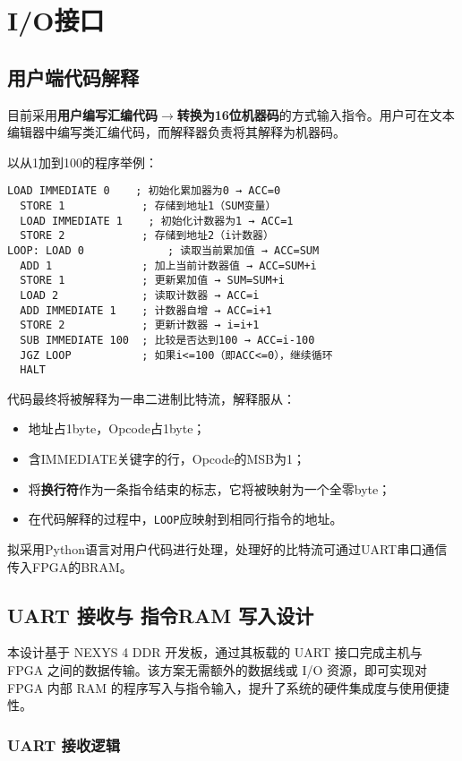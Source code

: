 \documentclass[lang=cn,a4paper,newtx]{elegantpaper}
\begin{document}
\section{I/O接口}
\subsection{用户端代码解释}
目前采用\textbf{用户编写汇编代码}$\to$\textbf{转换为16位机器码}的方式输入指令。用户可在文本编辑器中编写类汇编代码，而解释器负责将其解释为机器码。

以从1加到100的程序举例：
\begin{lstlisting}[language=Assembly]
  LOAD IMMEDIATE 0    ; 初始化累加器为0 → ACC=0
  STORE 1            ; 存储到地址1（SUM变量）
  LOAD IMMEDIATE 1    ; 初始化计数器为1 → ACC=1
  STORE 2            ; 存储到地址2（i计数器）
LOOP: LOAD 0             ; 读取当前累加值 → ACC=SUM
  ADD 1              ; 加上当前计数器值 → ACC=SUM+i
  STORE 1            ; 更新累加值 → SUM=SUM+i
  LOAD 2             ; 读取计数器 → ACC=i
  ADD IMMEDIATE 1    ; 计数器自增 → ACC=i+1
  STORE 2            ; 更新计数器 → i=i+1
  SUB IMMEDIATE 100  ; 比较是否达到100 → ACC=i-100
  JGZ LOOP           ; 如果i<=100（即ACC<=0），继续循环
  HALT
\end{lstlisting}

代码最终将被解释为一串二进制比特流，解释服从：
\begin{itemize}
  \item 地址占1byte，Opcode占1byte；
  \item 含IMMEDIATE关键字的行，Opcode的MSB为1；
  \item 将\textbf{换行符}作为一条指令结束的标志，它将被映射为一个全零byte；
  \item 在代码解释的过程中，\texttt{LOOP}应映射到相同行指令的地址。
\end{itemize}

拟采用Python语言对用户代码进行处理，处理好的比特流可通过UART串口通信传入FPGA的BRAM。


\subsection{UART 接收与 指令RAM 写入设计}

本设计基于 NEXYS 4 DDR 开发板，通过其板载的 UART 接口完成主机与 FPGA 之间的数据传输。该方案无需额外的数据线或 I/O 资源，即可实现对 FPGA 内部 RAM 的程序写入与指令输入，提升了系统的硬件集成度与使用便捷性。

\subsubsection{UART 接收逻辑}
\end{document}
